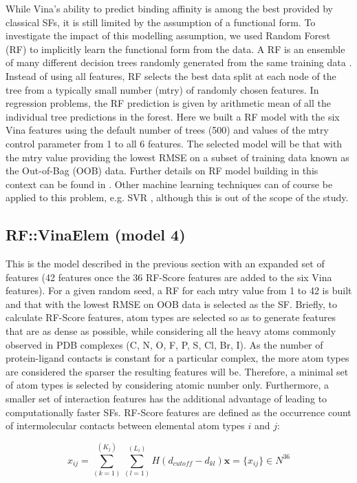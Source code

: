 While Vina's ability to predict binding affinity is among the best provided by classical SFs, it is still limited by the assumption of a functional form. To investigate the impact of this modelling assumption, we used Random Forest (RF) to implicitly learn the functional form from the data. A RF is an ensemble of many different decision trees randomly generated from the same training data \citep{1309}. Instead of using all features, RF selects the best data split at each node of the tree from a typically small number (mtry) of randomly chosen features. In regression problems, the RF prediction is given by arithmetic mean of all the individual tree predictions in the forest. Here we built a RF model with the six Vina features using the default number of trees (500) and values of the mtry control parameter from 1 to all 6 features. The selected model will be that with the mtry value providing the lowest RMSE on a subset of training data known as the Out-of-Bag (OOB) data. Further details on RF model building in this context can be found in \citep{564}. Other machine learning techniques can of course be applied to this problem, e.g. SVR \citep{1295}, although this is out of the scope of the study.

\subsection{RF::VinaElem (model 4)}

This is the model described in the previous section with an expanded set of features (42 features once the 36 RF-Score features are added to the six Vina features). For a given random seed, a RF for each mtry value from 1 to 42 is built and that with the lowest RMSE on OOB data is selected as the SF. Briefly, to calculate RF-Score features, atom types are selected so as to generate features that are as dense as possible, while considering all the heavy atoms commonly observed in PDB complexes (C, N, O, F, P, S, Cl, Br, I). As the number of protein-ligand contacts is constant for a particular complex, the more atom types are considered the sparser the resulting features will be. Therefore, a minimal set of atom types is selected by considering atomic number only. Furthermore, a smaller set of interaction features has the additional advantage of leading to computationally faster SFs. RF-Score features are defined as the occurrence count of intermolecular contacts between elemental atom types $i$ and $j$:

\begin{equation}
\label{rfscore3:x_ij}
x_{ij}=\sum_(k=1)^(K_j)\sum_(l=1)^(L_i)H(d_{cutoff}-d_{kl})   \mathbf x=\{x_{ij}\}\in N^36
\end{equation}

